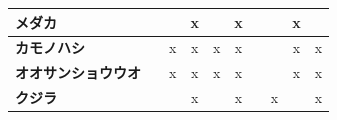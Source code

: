 \documentclass[a4j,8.5pt, twocolumn,fleqn]{jbook}
\begin{document}
\begin{table}[htb]
\begin{tabular}{|l|c|c|c|c|c|c|c|c|c|}
        \textbf{メダカ}       &                                    &                                    & x                                &                                  & x                                &                                  &                                  & x                                &                                   \\ \hline
        \textbf{カモノハシ}     &                                    & x                                  & x                                & x                                & x                                &                                  &                                  & x                                & x                                 \\ \hline
        \textbf{オオサンショウウオ} &                                    & x                                  & x                                & x                                & x                                &                                  &                                  & x                                & x                                 \\ \hline
        \textbf{クジラ}       &                                    &                                    & x                                &                                  & x                                &                                  & x                                &                                  & x                                 \\ \hline
    \end{tabular}
\end{table}
\end{document}
